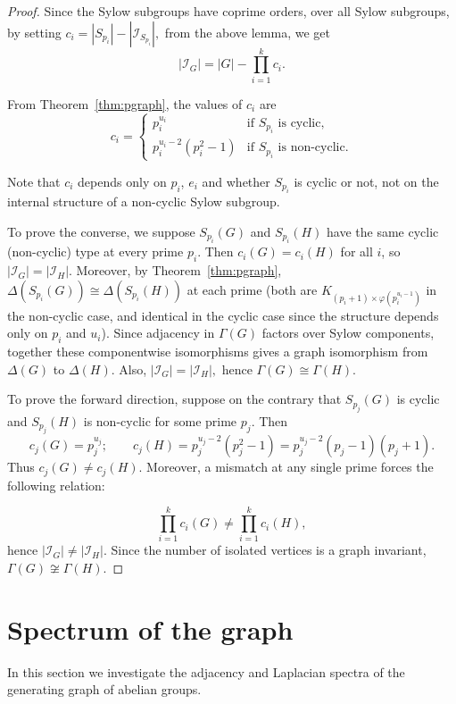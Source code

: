 \documentclass[11pt]{article}
\def \I {{\mathcal I}}
\begin{document}
\begin{proof}
Since the Sylow subgroups have coprime orders, over all Sylow subgroups, by setting 
$c_i = |S_{p_i}| - |{\I}_{S_{p_i}}|,$ from the above lemma, we get
$$|{\I}_G| = |G| - \prod_{i=1}^{k} c_i.$$

From Theorem~\ref{thm:pgraph}, the values of $c_i$ are
$$c_i = \begin{cases} p_i^{u_i}
& \text{if } S_{p_i} \text{ is cyclic,}\\[4pt] 
p_i^{u_i-2}(p_i^2-1) & \text{if } S_{p_i} \text{ is non-cyclic.}
\end{cases}$$

Note that $c_i$ depends only on $p_i$, $e_i$ and whether $S_{p_i}$ is 
cyclic or not, not on the internal structure of a non-cyclic Sylow 
subgroup.

To prove the converse, we suppose $S_{p_i}(G)$ and $S_{p_i}(H)$ have the 
same cyclic (non-cyclic) type at every prime $p_i$. Then $c_i(G) = c_i(H)$ 
for all $i$, so $|\I_G| = |\I_H|$. Moreover, by Theorem~\ref{thm:pgraph}, 
$\Delta(S_{p_i}(G)) \cong \Delta(S_{p_i}(H))$ at each prime (both are 
$K_{(p_i+1)\times \varphi(p_i^{u_i-1})}$ in the non-cyclic case, and 
identical in the cyclic case since the structure depends only on $p_i$ and 
$u_i$). Since adjacency in $\Gamma(G)$ factors over Sylow components, 
together these componentwise isomorphisms gives a graph isomorphism from $\Delta(G)$ to $\Delta(H).$ Also, $|\I_G|=|\I_H|,$ hence
$\Gamma(G) \cong \Gamma(H)$.


\medskip
 To prove the forward direction, suppose on the contrary that $S_{p_j}(G)$ is cyclic and $S_{p_j}(H)$ 
is non-cyclic for some prime $p_j.$ Then
$$c_j(G) = p_j^{u_j}; \qquad 
c_j(H) = p_j^{u_j-2}(p_j^2-1) = p_j^{u_j-2}(p_j-1)(p_j+1).$$ Thus $c_j(G)\neq c_j(H).$ Moreover, a mismatch at any single prime forces the following relation:

$$\prod_{i=1}^k c_i(G) \neq \prod_{i=1}^k c_i(H),$$
hence $|\I_G| \neq |\I_H|$. Since the number of isolated vertices is a 
graph invariant, $\Gamma(G) \not\cong \Gamma(H).$

\end{proof}



\section{Spectrum of the graph}\label{sec:6}
In this section we investigate the adjacency and Laplacian spectra of the generating graph of abelian groups. 
\end{document}

